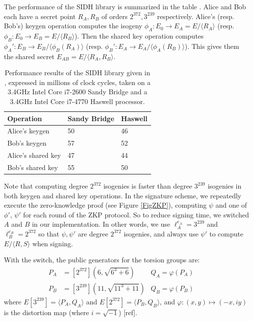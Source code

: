 \documentclass[runningheads,a4paper]{llncs}
\begin{document}
The performance of the SIDH library is summarized in the table \cite{Costello16}. Alice and Bob each have a secret point $R_A,R_B$ of orders $2^{372}, 3^{239}$ respectively.
Alice's (resp. Bob's) keygen operation computes the isogeny $\phi_A:E_0 \to E_A= E/\langle R_A\rangle$ (resp. $\phi_B:E_0 \to E_B= E/\langle R_B \rangle$). Then the shared key operation computes $\phi_A':E_B \to E_B / \langle \phi_B(R_A)\rangle$ (resp. $\phi_B': E_A \to E_A/ \langle \phi_A(R_B)\rangle$). This gives them the shared secret $E_{AB} = E/\langle R_A,R_B\rangle$. 

\begin{table}[ht]
\centering
\begin{tabular}{l|l|l}
Operation			&	Sandy Bridge	&	Haswell \\ \hline
Alice's keygen		&	50				&	46		\\
Bob's keygen		&	57				&	52		\\
Alice's shared key 	&	47				&	44		\\
Bob's shared key 	&	55 				&	50		
\end{tabular}
\caption{Performance results of the SIDH library given in \cite{Costello16}, expressed in millions of clock cycles, taken on a 3.4GHz Intel Core i7-2600 Sandy Bridge and a 3.4GHz Intel Core i7-4770 Haswell processor.}
\end{table}

Note that computing degree $2^{372}$ isogenies is faster than degree $3^{239}$ isogenies in both keygen and shared key operations.
In the signature scheme, we repeatedly execute the zero-knowledge proof (see Figure \ref{FigZKP}), computing $\psi$ and one of $\phi'$, $\psi'$ for each round of the ZKP protocol. So to reduce signing time, we switched $A$ and $B$ in our implementation. In other words, we use $\ell_A^{e_A} = 3^{239}$ and $\ell_B^{e_B} = 2^{372}$ so that $\psi,\psi'$ are degree $2^{372}$ isogenies, and always use $\psi'$ to compute $E/\langle R,S\rangle$ when signing.

With the switch, the public generators for the torsion groups are:
\begin{align*}
P_A &= [2^{372}](6, \sqrt{6^3+6}) 	& Q_A = \varphi(P_A)	&& \\
P_B &= [3^{239}](11,\sqrt{11^3+11}) 	& Q_B = \varphi(P_B) &&
\end{align*}
where $E[3^{239}] = \langle P_A,Q_A\rangle$ and $E[2^{372}] = \langle P_B, Q_B\rangle$,
and $\varphi: (x,y) \mapsto (-x,iy)$ is the distortion map (where $i = \sqrt{-1}$) [ref].
\end{document}
